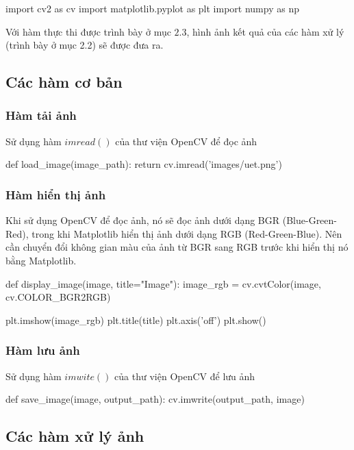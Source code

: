 \documentclass[a4paper]{article}
\begin{document}
\begin{python}
import cv2 as cv
import matplotlib.pyplot as plt
import numpy as np
\end{python}
Với hàm thực thi được trình bày ở mục $2.3$, hình ảnh kết quả của các hàm xử lý (trình bày ở mục 2.2) sẽ được đưa ra.
\subsection{Các hàm cơ bản}

\subsubsection{Hàm tải ảnh}
Sử dụng hàm $imread()$ của thư viện OpenCV để đọc ảnh

\begin{python}
def load_image(image_path):
    return cv.imread('images/uet.png')
\end{python}

\subsubsection{Hàm hiển thị ảnh}
Khi sử dụng OpenCV để đọc ảnh, nó sẽ đọc ảnh dưới dạng BGR (Blue-Green-Red), trong khi Matplotlib hiển thị ảnh dưới dạng RGB (Red-Green-Blue). Nên cần chuyển đổi không gian màu của ảnh từ BGR sang RGB trước khi hiển thị nó bằng Matplotlib.
\begin{python}
def display_image(image, title="Image"):
    image_rgb = cv.cvtColor(image, cv.COLOR_BGR2RGB)
    
    plt.imshow(image_rgb)
    plt.title(title)
    plt.axis('off')
    plt.show()
\end{python}

\subsubsection{Hàm lưu ảnh}
Sử dụng hàm $imwite()$ của thư viện OpenCV để lưu ảnh

\begin{python}
def save_image(image, output_path):
    cv.imwrite(output_path, image)
\end{python}

\subsection{Các hàm xử lý ảnh}
\end{document}
